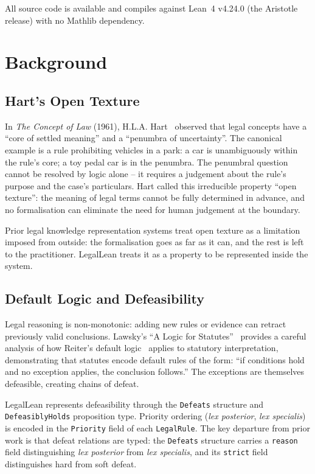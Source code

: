 \documentclass[runningheads]{llncs}
\begin{document}
All source code is available and compiles against Lean~4 v4.24.0 (the Aristotle
release) with no Mathlib dependency.

\section{Background}

\subsection{Hart's Open Texture}

In \textit{The Concept of Law} (1961), H.L.A. Hart~\cite{hart1961concept}
observed that legal concepts have a ``core of settled meaning'' and a
``penumbra of uncertainty''. The canonical example is a rule prohibiting
vehicles in a park: a car is unambiguously within the rule's core; a toy pedal
car is in the penumbra. The penumbral question cannot be resolved by logic alone
-- it requires a judgement about the rule's purpose and the case's particulars.
Hart called this irreducible property ``open texture'': the meaning of legal
terms cannot be fully determined in advance, and no formalisation can eliminate
the need for human judgement at the boundary.

Prior legal knowledge representation systems treat open texture as a limitation
imposed from outside: the formalisation goes as far as it can, and the rest is
left to the practitioner. LegalLean treats it as a property to be represented
inside the system.

\subsection{Default Logic and Defeasibility}

Legal reasoning is non-monotonic: adding new rules or evidence can retract
previously valid conclusions. Lawsky's ``A Logic for Statutes''~\cite{lawsky2017logic}
provides a careful analysis of how Reiter's default logic~\cite{reiter1980logic}
applies to statutory interpretation, demonstrating that statutes encode default
rules of the form: ``if conditions hold and no exception applies, the conclusion
follows.'' The exceptions are themselves defeasible, creating chains of defeat.

LegalLean represents defeasibility through the \texttt{Defeats} structure and
\texttt{DefeasiblyHolds} proposition type. Priority ordering (\textit{lex
posterior}, \textit{lex specialis}) is encoded in the \texttt{Priority} field of
each \texttt{LegalRule}. The key departure from prior work is that defeat
relations are typed: the \texttt{Defeats} structure carries a \texttt{reason}
field distinguishing \textit{lex posterior} from \textit{lex specialis}, and its
\texttt{strict} field distinguishes hard from soft defeat.
\end{document}
